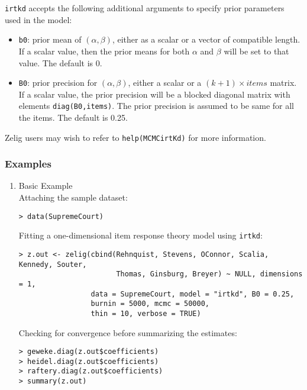 \noindent \texttt{irtkd} accepts the following additional arguments to 
specify prior parameters used in the model:

\begin{itemize}

\item \texttt{b0}: prior mean of $(\alpha, \beta)$, either as a scalar or
a vector of compatible length. If a scalar value, then the prior means
for both $\alpha$ and $\beta$ will be set to that value. The default
is 0.

\item \texttt{B0}: prior precision for $(\alpha, \beta)$, either a
scalar or a $(k+1) \times items$ matrix. If a scalar value, the prior
precision will be a blocked diagonal matrix with elements
\texttt{diag(B0,items)}. The prior precision is assumed to be same for
all the items. The default is 0.25.

\end{itemize}

Zelig users may wish to refer to \texttt{help(MCMCirtKd)} for more 
information.



\subsubsection{Examples}

\begin{enumerate}
\item {Basic Example} \\
Attaching the sample  dataset:
\begin{verbatim}
> data(SupremeCourt)
\end{verbatim}
Fitting a one-dimensional item response theory model using \texttt{irtkd}:
\begin{verbatim}
> z.out <- zelig(cbind(Rehnquist, Stevens, OConnor, Scalia, Kennedy, Souter, 
                       Thomas, Ginsburg, Breyer) ~ NULL, dimensions = 1,
                 data = SupremeCourt, model = "irtkd", B0 = 0.25, 
                 burnin = 5000, mcmc = 50000, 
                 thin = 10, verbose = TRUE)
\end{verbatim}

Checking for convergence before summarizing the estimates:
\begin{verbatim}
> geweke.diag(z.out$coefficients)
> heidel.diag(z.out$coefficients)
> raftery.diag(z.out$coefficients)
> summary(z.out)
\end{verbatim} %
\end{enumerate} 

